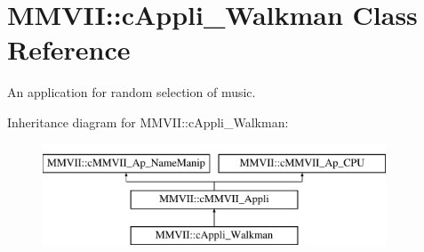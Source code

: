 \hypertarget{classMMVII_1_1cAppli__Walkman}{}\section{M\+M\+V\+II\+:\+:c\+Appli\+\_\+\+Walkman Class Reference}
\label{classMMVII_1_1cAppli__Walkman}


An application for random selection of music.  


Inheritance diagram for M\+M\+V\+II\+:\+:c\+Appli\+\_\+\+Walkman\+:\begin{figure}[H]
\begin{center}
\leavevmode
\includegraphics[height=3.000000cm]{classMMVII_1_1cAppli__Walkman}
\end{center}
\end{figure}
